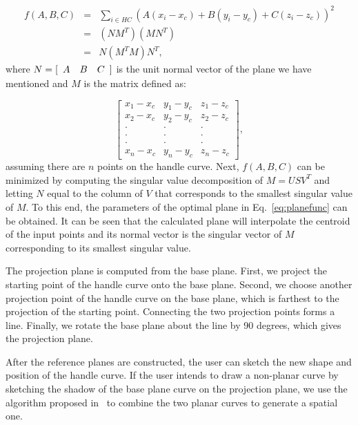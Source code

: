\begin{eqnarray}
\label{eq:planeobjnew}
    f(A,B,C) &=& \sum\limits_{i \in HC} {(A(x_i-x_c)+B(y_i-y_c)+C(z_i-z_c))^2}\nonumber\\
    &=& (NM^T)(MN^T)\nonumber\\
    &=& N (M^TM) N^T,
\end{eqnarray}
where $N = [\begin{array}{*{20}c} A & B & C \end{array}]$
is the unit normal vector of the plane we have mentioned
and $M$ is the matrix defined as:

\begin{equation*}
\begin{bmatrix}
x_1-x_c & y_1-y_c & z_1-z_c\\[-1em]
x_2-x_c & y_2-y_c & z_2-z_c\\[-1em]
\cdot & \cdot & \cdot\\[-1em]
\cdot & \cdot & \cdot\\[-1em]
\cdot & \cdot & \cdot\\[-1em]
x_n-x_c & y_n-y_c & z_n-z_c
\end{bmatrix},
\end{equation*}
assuming there are $n$ points on the handle curve. Next, $f(A,B,C)$
can be minimized by computing the singular value decomposition
of $M=USV^T$ and letting $N$ equal to the column of $V$
that corresponds to the smallest singular value of $M$.
To this end, the parameters of the optimal plane in
Eq.~\ref{eq:planefunc} can be obtained. It can be seen that
the calculated plane will interpolate the centroid of the
input points and its normal vector is the singular vector
of $M$ corresponding to its smallest singular value.


The projection plane is computed from the base plane. First, we
project the starting point of the handle curve onto the base plane.
Second, we choose another projection point of the handle curve on
the base plane, which is farthest to the projection of the starting
point. Connecting the two projection points forms a line. Finally,
we rotate the base plane about the line by 90 degrees, which gives
the projection plane.

After the reference planes are constructed, the user can sketch the
new shape and position of the handle curve. If the user intends to
draw a non-planar curve by sketching the shadow of the base plane
curve on the projection plane, we use the algorithm proposed
in~\cite{CMZHB99} to combine the two planar curves to generate a
spatial one.


